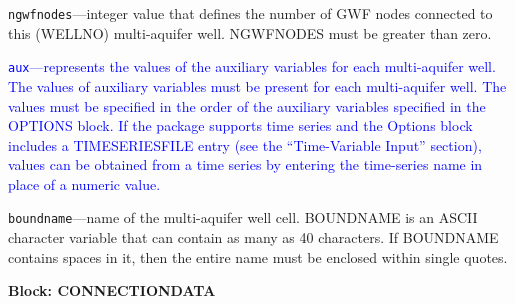 \begin{description}
\item \texttt{ngwfnodes}---integer value that defines the number of GWF nodes connected to this (WELLNO) multi-aquifer well. NGWFNODES must be greater than zero.

\item \textcolor{blue}{\texttt{aux}---represents the values of the auxiliary variables for each multi-aquifer well. The values of auxiliary variables must be present for each multi-aquifer well. The values must be specified in the order of the auxiliary variables specified in the OPTIONS block.  If the package supports time series and the Options block includes a TIMESERIESFILE entry (see the ``Time-Variable Input'' section), values can be obtained from a time series by entering the time-series name in place of a numeric value.}

\item \texttt{boundname}---name of the multi-aquifer well cell.  BOUNDNAME is an ASCII character variable that can contain as many as 40 characters.  If BOUNDNAME contains spaces in it, then the entire name must be enclosed within single quotes.

\end{description}
\item \textbf{Block: CONNECTIONDATA}

